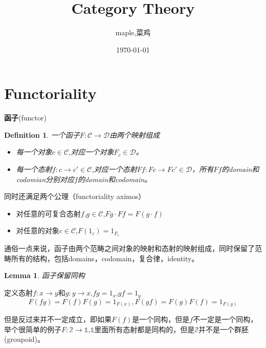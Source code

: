 \documentclass[UTF8,11pt,a4paper]{ctexart}
\title{Category Theory}
\author{maple,菜鸡}
\date{\today}
\newtheorem{lemma}[theorem]{Lemma}
\newtheorem{definition}[theorem]{Definition}
\newcommand*{\xfunc}[4]{{#2}\colon{#3}{#1}{#4}}
\newcommand*{\func}[3]{\xfunc{\to}{#1}{#2}{#3}}
\begin{document}
\maketitle

\section{Functoriality}

\begin{flushleft}
\textbf{函子}(functor)\\
\begin{definition}
一个函子$F \colon \mathcal{C} \rightarrow \mathcal{D}$由两个映射组成
\begin{itemize}
 \item 每一个对象$c \in \mathcal{C}$,对应一个对象$F_c \in \mathcal{D}$。
 \item 每一个态射$f \colon c \rightarrow	c' \in \mathcal{C}$,对应一个态射$Ff \colon Fc \rightarrow Fc' \in \mathcal{D}$，所有$Ff$的domain和codomian分别对应$f$的domain和codomain。 
\end{itemize}
\end{definition}
同时还满足两个公理（functoriality aximos）
\begin{itemize}
 	\item 对任意的可复合态射$f$,$g \in \mathcal{C}$,$Fg \cdot Ff = F(g \cdot f)$
 	\item 对任意的对象$c \in \mathcal{C}$,$F(1_c)=1_{F_c}$
\end{itemize}
通俗一点来说，函子由两个范畴之间对象的映射和态射的映射组成，同时保留了范畴所有的结构，包括domains，codomain，复合律，identity。
\end{flushleft}

\begin{lemma}
函子保留同构
\end{lemma}

定义态射$\func{f}{x}{y}$和$\func{g}{y}{x}$,$fg = 1_x$,$gf=1_y$ \[F(fg)=F(f)F(g)=1_{F(x)} , F(gf)=F(g)F(f)=1_{F(y)}\]

但是反过来并不一定成立，即如果$F(f)$是一个同构，但是$f$不一定是一个同构，举个很简单的例子$\func{F}{\mathbb{2}}{\mathbb{1}}$,$\mathbb{1}$里面所有态射都是同构的，但是$\mathbb{2}$并不是一个群胚(groupoid)。
\pagebreak
\end{document}
